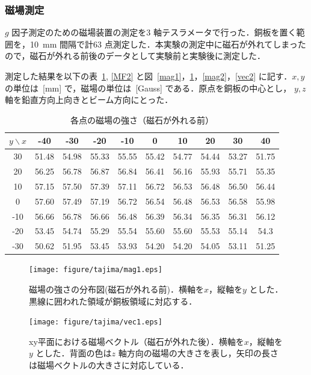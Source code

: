 \newpage

\subsubsection{磁場測定}
$g$ 因子測定のための磁場装置の測定を3 軸テスラメータで行った．銅板を置く範囲を，10~mm 間隔で計63 点測定した．本実験の測定中に磁石が外れてしまったので，磁石が外れる前後のデータとして実験前と実験後に測定した．

測定した結果を以下の表~\ref{MF1}, \ref{MF2} と図~\ref{mag1}，\ref{vec1}，\ref{mag2}，\ref{vec2} に記す．$x, y$の単位は~[mm] で，磁場の単位は~[Gauss] である．原点を銅板の中心とし， $y, z$軸を鉛直方向上向きとビーム方向にとった．
\begin{table}[H]
\centering
\caption{各点の磁場の強さ（磁石が外れる前）}\label{MF1}
\begin{tabular}{|c||c|c|c|c|c|c|c|c|c|}\hline
$y \backslash x$ & -40 & -30 & -20 & -10 & 0 & 10 & 20 & 30 & 40 \\ \hline \hline
30 & 51.48 & 54.98 & 55.33 & 55.55 & 55.42 & 54.77 & 54.44 & 53.27 & 51.75 \\ \hline
20 & 56.25 & 56.78 & 56.87 & 56.84 & 56.41 & 56.16 & 55.93 & 55.71 & 55.35 \\ \hline
10 & 57.15 & 57.50 & 57.39 & 57.11 & 56.72 & 56.53 & 56.48 & 56.50 & 56.44 \\ \hline
0 & 57.60 & 57.49 & 57.19 & 56.72 & 56.54 & 56.48 & 56.53 & 56.58 & 55.98 \\ \hline
-10 & 56.66 & 56.78 & 56.66 & 56.48 & 56.39 & 56.34 & 56.35 & 56.31 & 56.12 \\ \hline
-20 & 53.45 & 54.74 & 55.29 & 55.54 & 55.60 & 55.60 & 55.53 & 55.14 & 54.3 \\ \hline
-30 & 50.62 & 51.95 & 53.45 & 53.93 & 54.20 & 54.20 & 54.05 & 53.11 & 51.25 \\ \hline
\end{tabular}
\end{table}
\begin{figure}[H]
\centering
\begin{minipage}{0.45\hsize}
\centering
\texttt{[image: figure/tajima/mag1.eps]}
\caption{磁場の強さの分布図(磁石が外れる前)．横軸を$x$，縦軸を$y$ とした．黒線に囲われた領域が銅板領域に対応する．}
\label{mag1}
\end{minipage}
\begin{minipage}{0.45\hsize}
\centering
\texttt{[image: figure/tajima/vec1.eps]}
\caption{xy平面における磁場ベクトル（磁石が外れた後）．横軸を$x$，縦軸を$y$ とした．背面の色は$z$ 軸方向の磁場の大きさを表し，矢印の長さは磁場ベクトルの大きさに対応している．}
\label{vec1}
\end{minipage}
\end{figure}



